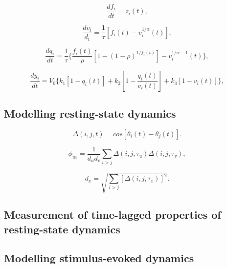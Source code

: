\documentclass[sn-mathphys-num]{sn-jnl}%
\theoremstyle{thmstyleone}%
\theoremstyle{thmstyletwo}%
\theoremstyle{thmstylethree}%
\begin{document}
\begin{equation}\label{eq:blood_inflow}
	\frac{df_i}{dt} = z_i(t),
\end{equation}


\begin{equation}\label{eq:blood_volume}
	\frac{dv_i}{d_t} = \frac{1}{\tau} [f_i(t) - v_i^{1/\alpha} (t)],
\end{equation}


\begin{equation}\label{eq:deoxyhaemoglobin}
	\frac{dq_i}{dt} = \frac{1}{\tau}
	\{
	\frac{f_i(t)}{\rho}
	[1 - (1-\rho)^{1/f_i(t)}]
	- v_i^{1/\alpha - 1} (t)
	\},
\end{equation}


\begin{equation}\label{eq:BOLD_signal}
	\frac{dy_i}{dt} = V_0
	\{
	k_1 [1 - q_i(t)] +
	k_2 [1 - \frac{q_i(t)}{v_i(t)}] + 
	k_3 [1 - v_i(t)]
	\},
\end{equation}


\subsection{Modelling resting-state dynamics} \label{sec:modelling_resting}


\begin{equation}\label{eq:synchrony}
	\Delta(i,j,t) = cos [\theta_i (t) - \theta_j (t)].
\end{equation}


\begin{equation}\label{eq:synchrony_similarity}
	\phi_{uv} = \frac{1}{d_u d_v} 
	\sum_{i>j} \Delta(i,j,\tau_u) \Delta(i,j,\tau_v),
\end{equation}

\begin{equation}\label{key}
	d_x = \sqrt{\sum_{i>j}
		[
		\Delta(i,j,\tau_x)
		]^2
	}.
\end{equation}


\subsection{Measurement of time-lagged properties of resting-state dynamics} \label{sec:dynamics_measurement}






\subsection{Modelling stimulus-evoked dynamics} \label{sec:modelling_stimulus}
\end{document}

